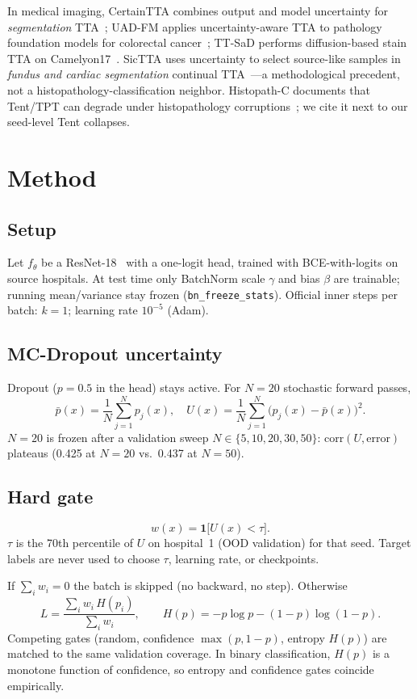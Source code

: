 \documentclass[conference]{IEEEtran}
\begin{document}
In medical imaging, CertainTTA combines output and model uncertainty for \emph{segmentation} TTA~\cite{certaintta2025}; UAD-FM applies uncertainty-aware TTA to pathology foundation models for colorectal cancer~\cite{uadfm2025}; TT-SaD performs diffusion-based stain TTA on Camelyon17~\cite{ttsad2024}.
SicTTA uses uncertainty to select source-like samples in \emph{fundus and cardiac segmentation} continual TTA~\cite{sictta2026}---a methodological precedent, not a histopathology-classification neighbor.
Histopath-C documents that Tent/TPT can degrade under histopathology corruptions~\cite{histopathc2026}; we cite it next to our seed-level Tent collapses.

\section{Method}
\subsection{Setup}
Let $f_\theta$ be a ResNet-18~\cite{he2016resnet} with a one-logit head, trained with BCE-with-logits on source hospitals.
At test time only BatchNorm scale $\gamma$ and bias $\beta$ are trainable; running mean/variance stay frozen (\texttt{bn\_freeze\_stats}).
Official inner steps per batch: $k{=}1$; learning rate $10^{-5}$ (Adam).

\subsection{MC-Dropout uncertainty}
Dropout ($p{=}0.5$ in the head) stays active.
For $N{=}20$ stochastic forward passes,
\[
\bar p(x)=\frac1N\sum_{j=1}^N p_j(x),\quad
U(x)=\frac1N\sum_{j=1}^N \bigl(p_j(x)-\bar p(x)\bigr)^2.
\]
$N{=}20$ is frozen after a validation sweep $N\in\{5,10,20,30,50\}$: $\mathrm{corr}(U,\mathrm{error})$ plateaus (0.425 at $N{=}20$ vs.\ 0.437 at $N{=}50$).

\subsection{Hard gate}
\[
w(x)=\mathbf{1}\bigl[U(x)<\tau\bigr].
\]
$\tau$ is the 70th percentile of $U$ on hospital~1 (OOD validation) for that seed.
Target labels are never used to choose $\tau$, learning rate, or checkpoints.

If $\sum_i w_i=0$ the batch is skipped (no backward, no step).
Otherwise
\[
L=\frac{\sum_i w_i\,H(p_i)}{\sum_i w_i},\qquad
H(p)=-p\log p-(1-p)\log(1-p).
\]
Competing gates (random, confidence $\max(p,1-p)$, entropy $H(p)$) are matched to the same validation coverage.
In binary classification, $H(p)$ is a monotone function of confidence, so entropy and confidence gates coincide empirically.
\end{document}
